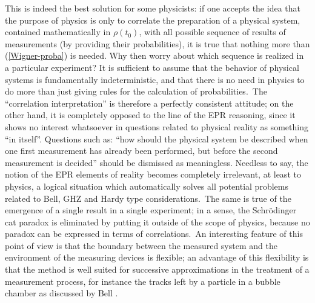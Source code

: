 \documentclass[12pt,onecolumn]{article}%
\begin{document}
This is indeed the best solution for some physicists: if one accepts the idea
that the purpose of physics is only to correlate the preparation of a physical
system, contained mathematically in $\rho(t_{0})$, with all possible sequence
of results of measurements (by providing their probabilities), it is true that
nothing more than (\ref{Wigner-proba}) is needed. Why then worry about which
sequence is realized in a particular experiment? It is sufficient to assume
that the behavior of physical systems is fundamentally indeterministic, and
that there is no need in physics to do more than just giving rules for the
calculation of probabilities.\ The ``correlation interpretation'' is therefore
a perfectly consistent attitude; on the other hand, it is completely opposed
to the line of the EPR reasoning, since it shows no interest whatsoever in
questions related to physical reality as something ``in itself''. Questions
such as: ``how should the physical system be described when one first
measurement has already been performed, but before the second measurement is
decided'' should be dismissed as meaningless. Needless to say, the notion of
the EPR elements of reality becomes completely irrelevant, at least to
physics, a logical situation which automatically solves all potential problems
related to Bell, GHZ and Hardy type considerations.\ The same is true of the
emergence of a single result in a single experiment; in a sense, the
Schr\"{o}dinger cat paradox is eliminated by putting it outside of the scope
of physics, because no paradox can be expressed in terms of correlations.\ An
interesting feature of this point of view is that the boundary between the
measured system and the environment of the measuring devices is flexible; an
advantage of this flexibility is that the method is well suited for successive
approximations in the treatment of a measurement process, for instance the
tracks left by a particle in a bubble chamber as discussed by Bell
\cite{Bell-speakable}.
\end{document}
